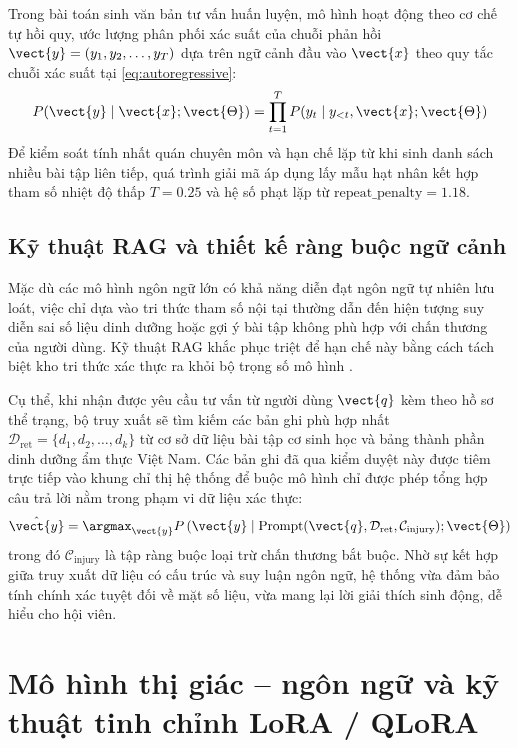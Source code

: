 Trong bài toán sinh văn bản tư vấn huấn luyện, mô hình hoạt động theo cơ chế tự hồi quy, ước lượng phân phối xác suất của chuỗi phản hồi $\vect{y} = (y_1, y_2, \dots, y_T)$ dựa trên ngữ cảnh đầu vào $\vect{x}$ theo quy tắc chuỗi xác suất tại \cref{eq:autoregressive}:
\begin{equation}
    P(\vect{y} \mid \vect{x}; \vect{\Theta}) = \prod_{t=1}^{T} P(y_t \mid y_{<t}, \vect{x}; \vect{\Theta})
    \label{eq:autoregressive}
\end{equation}
Để kiểm soát tính nhất quán chuyên môn và hạn chế lặp từ khi sinh danh sách nhiều bài tập liên tiếp, quá trình giải mã áp dụng lấy mẫu hạt nhân kết hợp tham số nhiệt độ thấp $T = 0.25$ và hệ số phạt lặp từ $\text{repeat\_penalty} = 1.18$.

\subsection{Kỹ thuật RAG và thiết kế ràng buộc ngữ cảnh}
\label{subsec:rag}

Mặc dù các mô hình ngôn ngữ lớn có khả năng diễn đạt ngôn ngữ tự nhiên lưu loát, việc chỉ dựa vào tri thức tham số nội tại thường dẫn đến hiện tượng suy diễn sai số liệu dinh dưỡng hoặc gợi ý bài tập không phù hợp với chấn thương của người dùng. Kỹ thuật RAG khắc phục triệt để hạn chế này bằng cách tách biệt kho tri thức xác thực ra khỏi bộ trọng số mô hình \cite{lewis2020rag}.

Cụ thể, khi nhận được yêu cầu tư vấn từ người dùng $\vect{q}$ kèm theo hồ sơ thể trạng, bộ truy xuất sẽ tìm kiếm các bản ghi phù hợp nhất $\mathcal{D}_{\text{ret}} = \{d_1, d_2, \dots, d_k\}$ từ cơ sở dữ liệu bài tập cơ sinh học và bảng thành phần dinh dưỡng ẩm thực Việt Nam. Các bản ghi đã qua kiểm duyệt này được tiêm trực tiếp vào khung chỉ thị hệ thống để buộc mô hình chỉ được phép tổng hợp câu trả lời nằm trong phạm vi dữ liệu xác thực:
\begin{equation}
    \hat{\vect{y}} = \argmax_{\vect{y}} P\left(\vect{y} \;\middle|\; \text{Prompt}(\vect{q}, \mathcal{D}_{\text{ret}}, \mathcal{C}_{\text{injury}}); \vect{\Theta}\right)
    \label{eq:rag_generation}
\end{equation}
trong đó $\mathcal{C}_{\text{injury}}$ là tập ràng buộc loại trừ chấn thương bắt buộc. Nhờ sự kết hợp giữa truy xuất dữ liệu có cấu trúc và suy luận ngôn ngữ, hệ thống vừa đảm bảo tính chính xác tuyệt đối về mặt số liệu, vừa mang lại lời giải thích sinh động, dễ hiểu cho hội viên.

\section{Mô hình thị giác -- ngôn ngữ và kỹ thuật tinh chỉnh LoRA / QLoRA}
\label{sec:vlm_lora}


